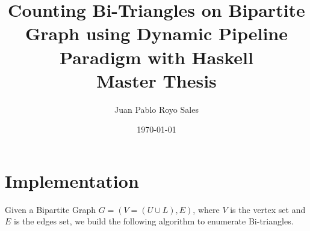 \documentclass[12pt, a4paper]{article}
\title{%
      Counting Bi-Triangles on Bipartite Graph using Dynamic Pipeline Paradigm with Haskell\\
      Master Thesis
}
\author{Juan Pablo Royo Sales}
\affil{Universitat Politècnica de Catalunya}
\date\today
\begin{document}


\section{Implementation}

Given a Bipartite Graph $G = (V = (U \cup L), E)$, where $V$ is the vertex set and 
$E$ is the edges set, we build the following algorithm to enumerate Bi-triangles.
\end{document}

